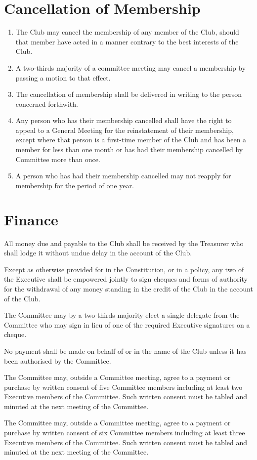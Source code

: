 \documentclass[11pt]{article} %
\begin{document}
\section{Cancellation of Membership}
\begin{enumerate}
\item The Club may cancel the membership of any member of the Club, should that member have acted in a manner contrary to the best interests of the Club.
\item A two-thirds majority of a committee meeting may cancel a membership by passing a motion to that effect.
\item The cancellation of membership shall be delivered in writing to the person concerned forthwith.
\item Any person who has their membership cancelled shall have the right to appeal to a General Meeting for the reinstatement of their membership, except where that person is a first-time member of the Club and has been a member for less than one month or has had their membership cancelled by Committee more than once.
\item A person who has had their membership cancelled may not reapply for membership for the period of one year.
\end{enumerate}

\section{Finance}
\begin{enumerate}
	\item All money due and payable to the Club shall be received by the Treasurer who shall lodge it without undue delay in the account of the Club.
	\item Except as otherwise provided for in the Constitution, or in a policy, any two of the Executive shall be empowered jointly to sign cheques and forms of authority for the withdrawal of any money standing in the credit of the Club in the account of the Club.
	\item The Committee may by a two-thirds majority elect a single delegate from the Committee who may sign in lieu of one of the required Executive signatures on a cheque.
	\item No payment shall be made on behalf of or in the name of the Club unless it has been authorised by the Committee.
	{\color{red}\item The Committee may, outside a Committee meeting, agree to a payment or purchase by written consent of five Committee members including at least two Executive members of the Committee. Such written consent must be tabled and minuted at the next meeting of the Committee.}
	{\color{ForestGreen}\item The Committee may, outside a Committee meeting, agree to a payment or purchase by written consent of six Committee members including at least three Executive members of the Committee. Such written consent must be tabled and minuted at the next meeting of the Committee.}
\end{enumerate}
\end{document}
